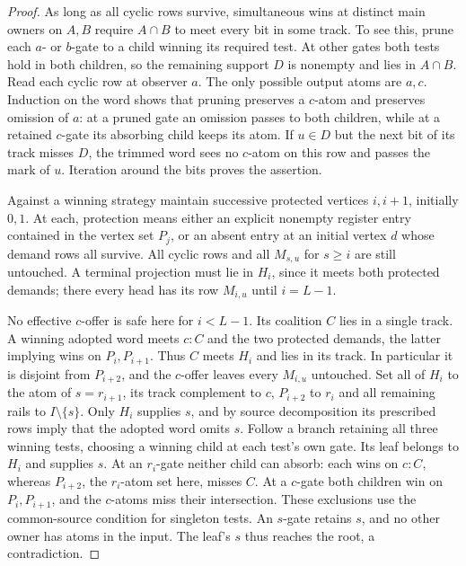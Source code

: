 \begin{proof}
As long as all cyclic rows survive, simultaneous wins at distinct
main owners on $A,B$ require $A\cap B$ to meet every bit in some
track. To see this, prune each $a$- or $b$-gate to a child winning its
required test. At other gates both tests hold in both children, so
the remaining support $D$ is nonempty and lies in $A\cap B$.
Read each cyclic row at observer $a$. The only possible output atoms
are $a,c$. Induction on the word shows that pruning preserves a
$c$-atom and preserves omission of $a$: at a pruned gate an omission
passes to both children, while at a retained $c$-gate its absorbing
child keeps its atom. If $u\in D$ but the next bit of its track
misses $D$, the trimmed word sees no $c$-atom on this row and passes
the mark of $u$. Iteration around the bits proves the assertion.

Against a winning strategy maintain successive protected vertices $i,i+1$,
initially $0,1$. At each, protection means either an explicit nonempty
register entry contained in the vertex set $P_j$, or an absent entry at
an initial vertex $d$ whose demand rows all survive. All cyclic rows
and all $M_{s,u}$ for $s\ge i$ are still untouched. A terminal
projection must lie in $H_i$, since it meets both protected demands;
there every head has its row $M_{i,u}$ until $i=L-1$.

No effective $c$-offer is safe here for $i<L-1$. Its coalition $C$
lies in a single track. A winning adopted word meets $c:C$ and the
two protected demands, the latter implying wins on $P_i,P_{i+1}$.
Thus $C$ meets $H_i$ and lies in its track. In particular it is disjoint
from $P_{i+2}$, and the $c$-offer leaves every $M_{i,u}$ untouched.
Set all of $H_i$ to the atom of $s=r_{i+1}$, its track complement to
$c$, $P_{i+2}$ to $r_i$ and all remaining rails to $I\setminus\{s\}$.
Only $H_i$ supplies $s$, and by source decomposition its prescribed
rows imply that the adopted word omits $s$. Follow a branch retaining
all three winning tests, choosing a winning child at each test's own
gate. Its leaf belongs to $H_i$ and supplies $s$. At an $r_i$-gate
neither child can absorb: each wins on $c:C$, whereas $P_{i+2}$,
the $r_i$-atom set here, misses $C$. At a $c$-gate both children
win on $P_i,P_{i+1}$, and the $c$-atoms miss their intersection.
These exclusions use the common-source condition for singleton tests.
An $s$-gate retains $s$, and no other owner has atoms in the input.
The leaf's $s$ thus reaches the root, a contradiction.


\end{proof}
